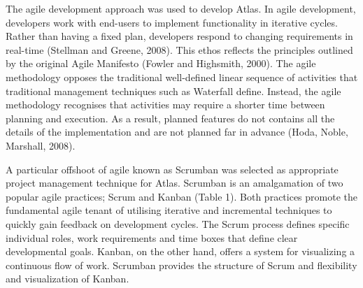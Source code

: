 \documentclass{article}
\begin{document}
The agile development approach was used to develop Atlas. In agile development, developers work with end-users to implement functionality in iterative cycles. Rather than having a fixed plan,  developers respond to changing requirements in real-time (Stellman and Greene, 2008). This ethos reflects the principles outlined by the original Agile Manifesto (Fowler and Highsmith, 2000). The agile methodology opposes the traditional well-defined linear sequence of activities that traditional management techniques such as Waterfall define. Instead, the agile methodology recognises that activities may require a shorter time between planning and execution. As a result, planned features do not contains all the details of the implementation and are not planned far in advance (Hoda, Noble, Marshall, 2008). 

A particular offshoot of agile known as Scrumban was selected as appropriate project management technique for Atlas. Scrumban is an amalgamation of two popular agile practices; Scrum and Kanban (Table 1). Both practices promote the fundamental agile tenant of utilising iterative and incremental techniques to quickly gain feedback on development cycles. The Scrum process defines specific individual roles, work requirements and time boxes that define clear developmental goals. Kanban, on the other hand, offers a system for visualizing a continuous flow of work. Scrumban provides the structure of Scrum and flexibility and visualization of Kanban. 
\end{document}
